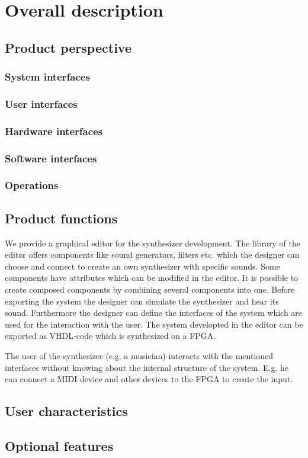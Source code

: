 \chapter{Overall description}
	\section{Product perspective}
		\subsection{System interfaces}
		\subsection{User interfaces}
		\subsection{Hardware interfaces}
		\subsection{Software interfaces}
		\subsection{Operations}
	\section{Product functions}
	We provide a graphical editor for the synthesizer development. The library of the editor offers components like sound generators, filters etc. which the designer can choose and connect to create an own synthesizer with specific sounds. Some components have attributes which can be modified in the editor. It is possible to create composed components by combining several components into one. Before exporting the system the designer can simulate the synthesizer and hear its sound. Furthermore the designer can define the interfaces of the system which are used for the interaction with the user.
The system developted in the editor can be exported as VHDL-code which is synthesized on a FPGA.

The user of the synthesizer (e.g. a musician) interacts with the mentioned interfaces without knowing about the internal structure of the system. E.g. he can connect a MIDI device and other devices to the FPGA to create the input. 
	\section{User characteristics}
	\section{Optional features}